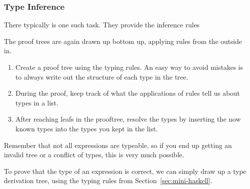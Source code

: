 \subsubsection{Type Inference}
\begin{examdetails}
    There typically is one such task. They provide the inference rules
\end{examdetails}

The proof trees are again drawn up bottom up, applying rules from the outside in.
\begin{enumerate}
    \item Create a proof tree using the typing rules.
          An easy way to avoid mistakes is to always write out the structure of each type in the tree.
    \item During the proof, keep track of what the applications of rules tell us about types in a list.
    \item After reaching leafs in the prooftree, resolve the types by inserting the now known types into the types you kept in the list.
\end{enumerate}
Remember that not all expressions are typeable, so if you end up getting an invalid tree or a conflict of types, this is very much possible.

To prove that the type of an expression is correct, we can simply draw up a type derivation tree, using the typing rules from Section~\ref{sec:mini-haskell}.
